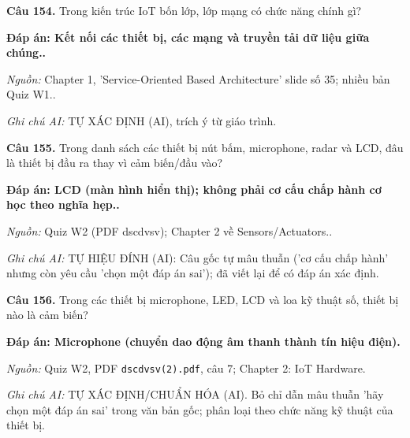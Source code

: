 \documentclass[11pt,a4paper]{article}
\begin{document}
\textbf{Câu 154.} Trong kiến trúc IoT bốn lớp, lớp mạng có chức năng chính gì?\par
{\color{answer}\textbf{Đáp án: Kết nối các thiết bị, các mạng và truyền tải dữ liệu giữa chúng..}}\par
{\footnotesize\color{sourcegray}\textit{Nguồn:} Chapter 1, 'Service-Oriented Based Architecture' slide số 35; nhiều bản Quiz W1..\par}
{\footnotesize\color{sourcegray}\textit{Ghi chú AI:} TỰ XÁC ĐỊNH (AI), trích ý từ giáo trình.\par}
\vspace{3pt}\par\noindent{\color{black!18}\rule{\linewidth}{0.3pt}}\par\medskip

\textbf{Câu 155.} Trong danh sách các thiết bị nút bấm, microphone, radar và LCD, đâu là thiết bị đầu ra thay vì cảm biến/đầu vào?\par
{\color{answer}\textbf{Đáp án: LCD (màn hình hiển thị); không phải cơ cấu chấp hành cơ học theo nghĩa hẹp..}}\par
{\footnotesize\color{sourcegray}\textit{Nguồn:} Quiz W2 (PDF dscdvsv); Chapter 2 về Sensors/Actuators..\par}
{\footnotesize\color{sourcegray}\textit{Ghi chú AI:} TỰ HIỆU ĐÍNH (AI): Câu gốc tự mâu thuẫn ('cơ cấu chấp hành' nhưng còn yêu cầu 'chọn một đáp án sai'); đã viết lại để có đáp án xác định.\par}
\vspace{3pt}\par\noindent{\color{black!18}\rule{\linewidth}{0.3pt}}\par\medskip

\textbf{Câu 156.} Trong các thiết bị microphone, LED, LCD và loa kỹ thuật số, thiết bị nào là cảm biến?\par
{\color{answer}\textbf{Đáp án: Microphone (chuyển dao động âm thanh thành tín hiệu điện).}}\par
{\footnotesize\color{sourcegray}\textit{Nguồn:} Quiz W2, PDF \texttt{dscdvsv(2).pdf}, câu 7; Chapter 2: IoT Hardware.\par}
{\footnotesize\color{sourcegray}\textit{Ghi chú AI:} TỰ XÁC ĐỊNH/CHUẨN HÓA (AI). Bỏ chỉ dẫn mâu thuẫn 'hãy chọn một đáp án sai' trong văn bản gốc; phân loại theo chức năng kỹ thuật của thiết bị.\par}
\vspace{3pt}\par\noindent{\color{black!18}\rule{\linewidth}{0.3pt}}\par\medskip
\end{document}
